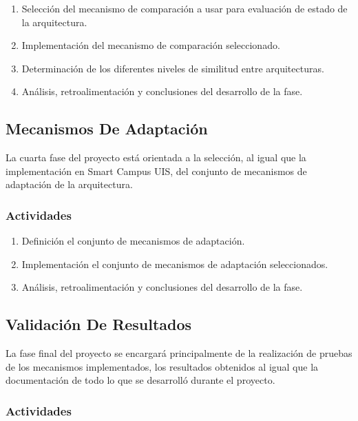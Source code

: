 \documentclass[12pt]{article}
\begin{document}
\begin{enumerate}[label=\thesubsection.\arabic*., wide, labelindent=2em, leftmargin=5em]
	\item Selección del mecanismo de comparación a usar para evaluación de estado de la arquitectura.
	\item Implementación del mecanismo de comparación seleccionado.
	\item Determinación de los diferentes niveles de similitud entre arquitecturas.
	\item Análisis, retroalimentación y conclusiones del desarrollo de la fase.
\end{enumerate}

\subsection{Mecanismos De Adaptación}

La cuarta fase del proyecto está orientada a la selección, al igual que la implementación en Smart Campus UIS, del conjunto de mecanismos de adaptación de la arquitectura.

\subsubsection*{Actividades}

\begin{enumerate}[label=\thesubsection.\arabic*., wide, labelindent=2em, leftmargin=5em]
	\item Definición el conjunto de mecanismos de adaptación.
	\item Implementación el conjunto de mecanismos de adaptación seleccionados.
	\item Análisis, retroalimentación y conclusiones del desarrollo de la fase.
\end{enumerate}

\subsection{Validación De Resultados}

La fase final del proyecto se encargará principalmente de la realización de pruebas de los mecanismos implementados, los resultados obtenidos al igual que la documentación de todo lo que se desarrolló durante el proyecto.

\subsubsection*{Actividades}
\end{document}
